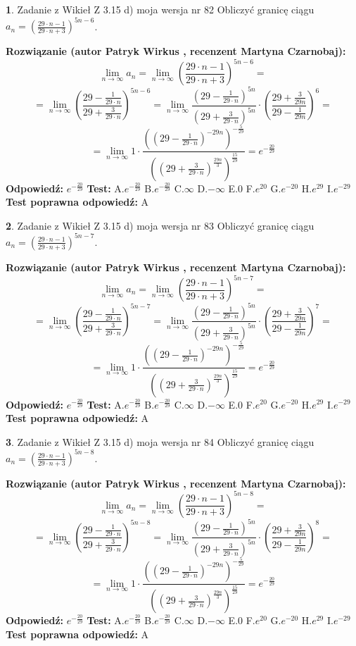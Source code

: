 \documentclass[12pt, a4paper]{article}
\theoremstyle{definition} %
\newtheorem{zad}{}
\newcommand{\zadStart}[1]{\begin{zad}#1\newline}
\newcommand{\zadStop}{\end{zad}}
\newcommand{\rozwStart}[2]{\noindent \textbf{Rozwiązanie (autor #1 , recenzent #2): }\newline}
\newcommand{\rozwStop}{\newline}
\newcommand{\odpStart}{\noindent \textbf{Odpowiedź:}\newline}
\newcommand{\odpStop}{\newline}
\newcommand{\testStart}{\noindent \textbf{Test:}\newline}
\newcommand{\testStop}{\newline}
\newcommand{\kluczStart}{\noindent \textbf{Test poprawna odpowiedź:}\newline}
\newcommand{\kluczStop}{\newline}
\begin{document}
\zadStart{Zadanie z Wikieł Z 3.15 d) moja wersja nr 82}
Obliczyć granicę ciągu $a_{n}=(\frac{29\cdot n - 1}{29 \cdot n + 3})^{5n-6}$.
\zadStop
\rozwStart{Patryk Wirkus}{Martyna Czarnobaj}
$$\lim\limits_{n\to\infty} a_{n} = \lim\limits_{n\to\infty}(\frac{29\cdot n - 1}{29 \cdot n + 3})^{5n-6}=$$
$$=\lim\limits_{n\to\infty}(\frac{29 - \frac{1}{29\cdot n}}{29 + \frac{3}{29 \cdot n}})^{5n-6}=\lim\limits_{n\to\infty}\frac{(29 - \frac{1}{29\cdot n})^{5n}}{(29 + \frac{3}{29\cdot n})^{5n}} \cdot (\frac{29+\frac{3}{29n}}{29-\frac{1}{29n}})^{6}=$$
$$=\lim\limits_{n\to\infty} 1 \cdot \frac{((29-\frac{1}{29 \cdot n})^{-29n})^{-\frac{5}{29}}}{((29+\frac{3}{29 \cdot n})^{\frac{29n}{3}})^{\frac{15}{29}}} =e^{-\frac{20}{29}}$$
\rozwStop
\odpStart
$e^{-\frac{20}{29}}$
\odpStop
\testStart
A.$ e^{-\frac{20}{29}}$
B.$ e^{-\frac{20}{29}}$
C.$\infty$
D.$-\infty$
E.$0$
F.$e^{20}$
G.$e^{-20}$
H.$e^{29}$
I.$e^{-29}$
\testStop
\kluczStart
A
\kluczStop



\zadStart{Zadanie z Wikieł Z 3.15 d) moja wersja nr 83}
Obliczyć granicę ciągu $a_{n}=(\frac{29\cdot n - 1}{29 \cdot n + 3})^{5n-7}$.
\zadStop
\rozwStart{Patryk Wirkus}{Martyna Czarnobaj}
$$\lim\limits_{n\to\infty} a_{n} = \lim\limits_{n\to\infty}(\frac{29\cdot n - 1}{29 \cdot n + 3})^{5n-7}=$$
$$=\lim\limits_{n\to\infty}(\frac{29 - \frac{1}{29\cdot n}}{29 + \frac{3}{29 \cdot n}})^{5n-7}=\lim\limits_{n\to\infty}\frac{(29 - \frac{1}{29\cdot n})^{5n}}{(29 + \frac{3}{29\cdot n})^{5n}} \cdot (\frac{29+\frac{3}{29n}}{29-\frac{1}{29n}})^{7}=$$
$$=\lim\limits_{n\to\infty} 1 \cdot \frac{((29-\frac{1}{29 \cdot n})^{-29n})^{-\frac{5}{29}}}{((29+\frac{3}{29 \cdot n})^{\frac{29n}{3}})^{\frac{15}{29}}} =e^{-\frac{20}{29}}$$
\rozwStop
\odpStart
$e^{-\frac{20}{29}}$
\odpStop
\testStart
A.$ e^{-\frac{20}{29}}$
B.$ e^{-\frac{20}{29}}$
C.$\infty$
D.$-\infty$
E.$0$
F.$e^{20}$
G.$e^{-20}$
H.$e^{29}$
I.$e^{-29}$
\testStop
\kluczStart
A
\kluczStop



\zadStart{Zadanie z Wikieł Z 3.15 d) moja wersja nr 84}
Obliczyć granicę ciągu $a_{n}=(\frac{29\cdot n - 1}{29 \cdot n + 3})^{5n-8}$.
\zadStop
\rozwStart{Patryk Wirkus}{Martyna Czarnobaj}
$$\lim\limits_{n\to\infty} a_{n} = \lim\limits_{n\to\infty}(\frac{29\cdot n - 1}{29 \cdot n + 3})^{5n-8}=$$
$$=\lim\limits_{n\to\infty}(\frac{29 - \frac{1}{29\cdot n}}{29 + \frac{3}{29 \cdot n}})^{5n-8}=\lim\limits_{n\to\infty}\frac{(29 - \frac{1}{29\cdot n})^{5n}}{(29 + \frac{3}{29\cdot n})^{5n}} \cdot (\frac{29+\frac{3}{29n}}{29-\frac{1}{29n}})^{8}=$$
$$=\lim\limits_{n\to\infty} 1 \cdot \frac{((29-\frac{1}{29 \cdot n})^{-29n})^{-\frac{5}{29}}}{((29+\frac{3}{29 \cdot n})^{\frac{29n}{3}})^{\frac{15}{29}}} =e^{-\frac{20}{29}}$$
\rozwStop
\odpStart
$e^{-\frac{20}{29}}$
\odpStop
\testStart
A.$ e^{-\frac{20}{29}}$
B.$ e^{-\frac{20}{29}}$
C.$\infty$
D.$-\infty$
E.$0$
F.$e^{20}$
G.$e^{-20}$
H.$e^{29}$
I.$e^{-29}$
\testStop
\kluczStart
A
\kluczStop
\end{document}
